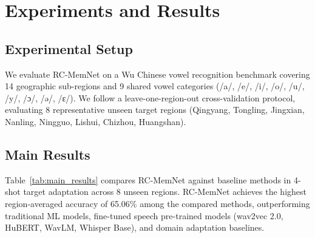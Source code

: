 \documentclass[letterpaper]{article} %
\begin{document}
\section{Experiments and Results}

\subsection{Experimental Setup}
We evaluate RC-MemNet on a Wu Chinese vowel recognition benchmark covering 14 geographic sub-regions and 9 shared vowel categories (/a/, /e/, /i/, /o/, /u/, /y/, /ɔ/, /ə/, /ɛ/). We follow a leave-one-region-out cross-validation protocol, evaluating 8 representative unseen target regions (Qingyang, Tongling, Jingxian, Nanling, Ningguo, Lishui, Chizhou, Huangshan).

\subsection{Main Results}
Table~\ref{tab:main_results} compares RC-MemNet against baseline methods in 4-shot target adaptation across 8 unseen regions. RC-MemNet achieves the highest region-averaged accuracy of 65.06\% among the compared methods, outperforming traditional ML models, fine-tuned speech pre-trained models (wav2vec 2.0, HuBERT, WavLM, Whisper Base), and domain adaptation baselines.

\begin{table}[t]
\centering
\caption{Cross-regional Wu vowel recognition Accuracy (\%) under 4-shot target adaptation across 8 unseen regions. All baseline values correspond to the official finalized experiment results.}
\label{tab:main_results}
\end{table}
\end{document}
